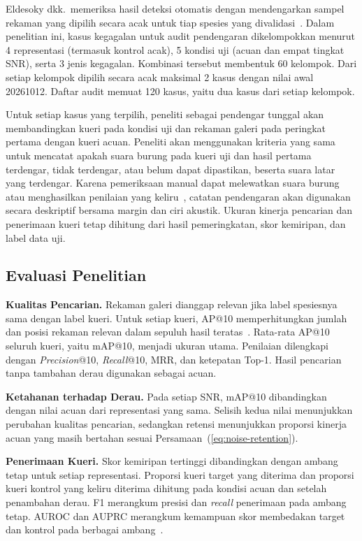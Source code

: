Eldesoky dkk.\ memeriksa hasil deteksi otomatis dengan mendengarkan sampel rekaman yang dipilih secara acak untuk tiap spesies yang divalidasi~\cite{eldesoky2025audit}. Dalam penelitian ini, kasus kegagalan untuk audit pendengaran dikelompokkan menurut 4 representasi (termasuk kontrol acak), 5 kondisi uji (acuan dan empat tingkat SNR), serta 3 jenis kegagalan. Kombinasi tersebut membentuk 60 kelompok. Dari setiap kelompok dipilih secara acak maksimal 2 kasus dengan nilai awal 20261012. Daftar audit memuat 120 kasus, yaitu dua kasus dari setiap kelompok.

Untuk setiap kasus yang terpilih, peneliti sebagai pendengar tunggal akan membandingkan kueri pada kondisi uji dan rekaman galeri pada peringkat pertama dengan kueri acuan. Peneliti akan menggunakan kriteria yang sama untuk mencatat apakah suara burung pada kueri uji dan hasil pertama terdengar, tidak terdengar, atau belum dapat dipastikan, beserta suara latar yang terdengar. Karena pemeriksaan manual dapat melewatkan suara burung atau menghasilkan penilaian yang keliru~\cite{fairbairn2025birdnet}, catatan pendengaran akan digunakan secara deskriptif bersama margin dan ciri akustik. Ukuran kinerja pencarian dan penerimaan kueri tetap dihitung dari hasil pemeringkatan, skor kemiripan, dan label data uji.

\subsection{Evaluasi Penelitian}
\label{subsec:evaluasi}

\textbf{Kualitas Pencarian.} Rekaman galeri dianggap relevan jika label spesiesnya sama dengan label kueri. Untuk setiap kueri, AP@10 memperhitungkan jumlah dan posisi rekaman relevan dalam sepuluh hasil teratas~\cite{moffat2022metrics}. Rata-rata AP@10 seluruh kueri, yaitu mAP@10, menjadi ukuran utama. Penilaian dilengkapi dengan \textit{Precision}@10, \textit{Recall}@10, MRR, dan ketepatan Top-1. Hasil pencarian tanpa tambahan derau digunakan sebagai acuan.

\textbf{Ketahanan terhadap Derau.} Pada setiap SNR, mAP@10 dibandingkan dengan nilai acuan dari representasi yang sama. Selisih kedua nilai menunjukkan perubahan kualitas pencarian, sedangkan retensi menunjukkan proporsi kinerja acuan yang masih bertahan sesuai Persamaan~(\ref{eq:noise-retention}).

\textbf{Penerimaan Kueri.} Skor kemiripan tertinggi dibandingkan dengan ambang tetap untuk setiap representasi. Proporsi kueri target yang diterima dan proporsi kueri kontrol yang keliru diterima dihitung pada kondisi acuan dan setelah penambahan derau. F1 merangkum presisi dan \textit{recall} penerimaan pada ambang tetap. AUROC dan AUPRC merangkum kemampuan skor membedakan target dan kontrol pada berbagai ambang~\cite{saito2015pr}.


